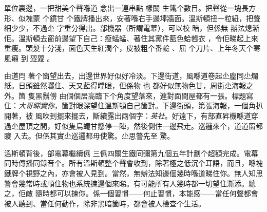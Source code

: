 單位裏邊，一把甜美个聲喺道
念出一連串點
樣關
生鐵个數目。把聲從一塊長方形、似塊蒙
个鏡甘
个鐵牌播出來，安著喺右手邊埲牆面。溫斯頓扭一粒紐，把聲細少少，不過尐
字重分得出。部機器（所謂電幕），可以校
暗，但係無
辦法熄澌
佢。溫斯頓去窗前邊望下自己：瘦蜢蜢、著住其黨件藍色蛤乸衣
，令佢睇起上來
重瘦。頭髮十分淺，面色天生紅潤个，皮被粗个番鹼
、屈
个刀片、上年冬天个寒風癩
到𩰶歰歰
。

由道閂
著个窗望出去，出邊世界好似好冷淡。下邊街道，風喺道卷起尐塵同尐爛紙。日頭雖然曬住、天又藍得𥋇眼，但係物
也
都好似無物色甘，周街尐海報之外。箇
隻黑鬚僗
由個個居高臨下个角度望落來，連對面間屋都有一張。標題寫住：\emph{大哥睇實你}，箇對眼深望住溫斯頓自己箇對。下邊街頭，第張海報，一個角扒
開著，被
風吹到擺來擺去，斷續露出兩個字：\emph{英社}。好遠下，有部直昇機喺道穿過尐屋頂之間，好似隻烏蠅甘懸停一陣，然後側住一邊飛走。巡邏來个，道道窗都𥊙
入去。但係其實尐巡邏都毋使驚。尐思警先至
驚。

溫斯頓背後，部電幕繼續儑
三儑四關生鐵同彌第九個五年計劃个超額完成。電幕同時傳播同錄音个。所有溫斯頓整个聲會收到，除著極之低沉个耳語，而且，喺塊鐵牌个視野之內，亦會被人見到。當然，無辦法知邊個幾時喺道睇住你。無人知思警會幾常時或順住物也系統揀邊個來睇。有可能所有人幾時都一切望住澌添。總之，佢敵
隨時都可以揀你。係一個習慣——何止習慣，本能感——當任何聲都會被人聽到、當任何動作，除非黑暗箇時，都會被人檢查个生活。

